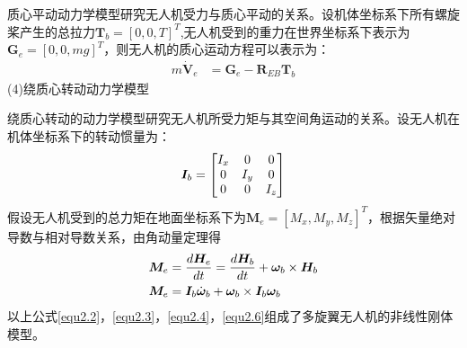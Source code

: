 质心平动动力学模型研究无人机受力与质心平动的关系。设机体坐标系下所有螺旋桨产生的总拉力$\boldsymbol{T}_b=[0,0,T]^{T}$,无人机受到的重力在世界坐标系下表示为$\boldsymbol{G}_e=[0,0,mg]^T$，则无人机的质心运动方程可以表示为：
\begin{equation}
\label{equ2.4}
\begin{aligned}
m\boldsymbol{\dot{V}}_e &= \boldsymbol{G}_e -  \boldsymbol{R}_{EB} \boldsymbol{T}_b
\end{aligned}
\end{equation}
(4)绕质心转动动力学模型

绕质心转动的动力学模型研究无人机所受力矩与其空间角运动的关系。设无人机在机体坐标系下的转动惯量为：
\begin{equation}
\label{equ2.5}
\boldsymbol{I}_b = 
\begin{bmatrix}
I_x & 0 & 0 \cr
0 & I_y & 0 \cr
0 & 0 & I_z \cr
\end{bmatrix}
\end{equation}
假设无人机受到的总力矩在地面坐标系下为$\boldsymbol{M}_e=[M_x,M_y,M_z]^T$，根据矢量绝对导数与相对导数关系，由角动量定理得
\begin{equation}
\label{equ2.6}
\begin{aligned}
\boldsymbol{M}_e &= {d\boldsymbol{H}_e \over dt} = {d\boldsymbol{H}_b \over dt} +  \boldsymbol{\omega}_b \times \boldsymbol{H}_b 
\\
\boldsymbol{M}_e &= \boldsymbol{I}_b \dot{\boldsymbol{\omega}}_b +\boldsymbol{\omega}_b \times \boldsymbol{I}_b \boldsymbol{\omega}_b 
\end{aligned}
\end{equation}
以上公式\eqref{equ2.2}，\eqref{equ2.3}，\eqref{equ2.4}，\eqref{equ2.6}组成了多旋翼无人机的非线性刚体模型。

